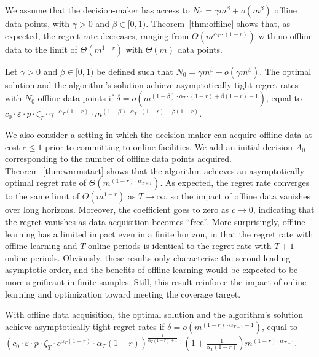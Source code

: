 \documentclass[nonblindrev]{informs3noheader}
\begin{document}
We assume that the decision-maker has access to $N_0=\gamma m^\beta+o\left(m^\beta\right)$ offline data points, with $\gamma>0$ and $\beta\in[0,1)$. Theorem~\ref{thm:offline} shows that, as expected, the regret rate decreases, ranging from $\Theta\left(m^{\alpha_T\cdot(1-r)}\right)$ with no offline data to the limit of $\Theta\left(m^{1-r}\right)$ with $\Theta(m)$ data points.

\begin{theorem}\label{thm:offline}
	Let $\gamma>0$ and $\beta\in[0,1)$ be defined such that $N_0=\gamma m^\beta+o\left(\gamma m^\beta\right)$. The optimal solution and the algorithm's solution achieve asymptotically tight regret rates with $N_0$ offline data points if $\delta = o\left(m^{(1-\beta)\cdot\alpha_T\cdot(1-r)+\beta(1-r)-1}\right)$, equal to $c_0 \cdot \varepsilon\cdot p\cdot\zeta_T\cdot \gamma^{-\alpha_T(1-r)}\cdot m^{(1-\beta)\cdot\alpha_T\cdot(1-r)+\beta(1-r)}$.
\end{theorem}

We also consider a setting in which the decision-maker can acquire offline data at cost $c\leq1$ prior to committing to online facilities. We add an initial decision $A_0$ corresponding to the number of offline data points acquired. Theorem~\ref{thm:warmstart} shows that the algorithm achieves an asymptotically optimal regret rate of $\Theta\left(m^{(1-r)\cdot\alpha_{T+1}}\right)$. As expected, the regret rate converges to the same limit of $\Theta(m^{1-r})$ as $T \to \infty$, so the impact of offline data vanishes over long horizons. Moreover, the coefficient goes to zero as $c\to0$, indicating that the regret vanishes as data acquisition becomes ``free''. More surprisingly, offline learning has a limited impact even in a finite horizon, in that the regret rate with offline learning and $T$ online periods is identical to the regret rate with $T+1$ online periods. Obviously, these results only characterize the second-leading asymptotic order, and the benefits of offline learning would be expected to be more significant in finite samples. Still, this result reinforce the impact of online learning and optimization toward meeting the coverage target.

\begin{theorem}\label{thm:warmstart}
	With offline data acquisition, the optimal solution and the algorithm's solution achieve asymptotically tight regret rates if $\delta = o\left(m^{(1-r)\cdot\alpha_{T+1}-1}\right)$, equal to $\left(c_0\cdot\varepsilon\cdot p\cdot\zeta_T\cdot c^{\alpha_T(1-r)}\cdot\alpha_T(1-r)\right)^{\frac{1}{\alpha_T(1-r)+1}}\cdot \left(1+\frac{1}{\alpha_T(1-r)}\right)m^{(1-r)\cdot\alpha_{T+1}}$.
\end{theorem}
\end{document}
